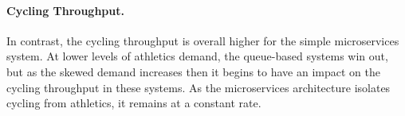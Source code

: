 \paragraph{Cycling Throughput.}  In contrast, the cycling throughput is overall higher for the simple microservices system.  At lower levels of athletics demand, the queue-based systems win out, but as the skewed demand increases then it begins to have an impact on the cycling throughput in these systems.  As the microservices architecture isolates cycling from athletics, it remains at a constant rate.